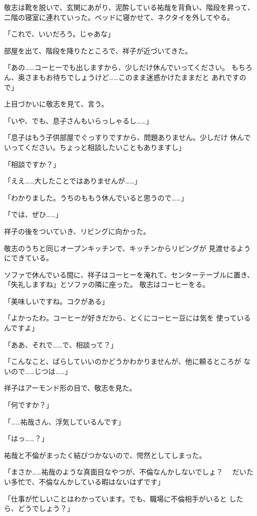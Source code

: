 ﻿\documentclass[
    book,tate,
    line_length=30zw,
    jafontsize=12pt,
    paper=b5j,
    landscape,
    ]{jlreq}
\begin{document}
敬志は靴を脱いで、玄関にあがり、泥酔している祐哉を背負い、階段を昇って、
二階の寝室に連れていった。ベッドに寝かせて、ネクタイを外してやる。

「これで、いいだろう。じゃあな」

部屋を出て、階段を降りたところで、祥子が近づいてきた。

「あの……コーヒーでも出しますから、少しだけ休んでいってください。
もちろん、奥さまもお待ちでしょうけど……このまま迷惑かけたままだと
あれですので」

上目づかいに敬志を見て、言う。

「いや、でも、息子さんもいらっしゃるし……」

「息子はもう子供部屋でぐっすりですから、問題ありません。少しだけ
休んでいってください。ちょっと相談したいこともありますし」

「相談ですか？」

「ええ……大したことではありませんが……」

「わかりました。うちのももう休んでいると思うので……」

「では、ぜひ……」

祥子の後をついていき、リビングに向かった。

敬志のうちと同じオープンキッチンで、キッチンからリビングが
見渡せるようにできている。

ソファで休んでいる間に、祥子はコーヒーを淹れて、センターテーブルに置き、
「失礼しますね」とソファの隣に座った。 敬志はコーヒーをる。

「美味しいですね。コクがある」

「よかったわ。コーヒーが好きだから、とくにコーヒー豆には気を
使っているんですよ」

「ああ、それで……で、相談って？」

「こんなこと、ばらしていいのかどうかわかりませんが、他に頼るところが
ないので……じつは……」

祥子はアーモンド形の目で、敬志を見た。

「何ですか？」

「……祐哉さん、浮気しているんです」

「はっ……？」

祐哉と不倫がまったく結びつかないので、愕然としてしまった。

「まさか……祐哉のような真面目なやつが、不倫なんかしないでしょ？　
だいたい多忙で、不倫なんかしている暇はないはずです」

「仕事が忙しいことはわかっています。でも、職場に不倫相手がいると
したら、どうでしょう？」
\end{document}
